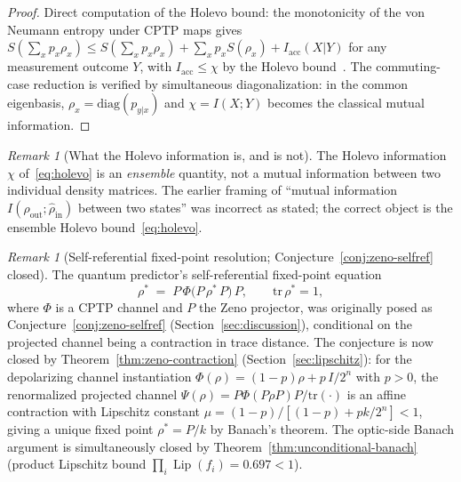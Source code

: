 \documentclass[11pt,a4paper]{article}
\theoremstyle{plain}
\theoremstyle{definition}
\theoremstyle{remark}
\newtheorem{remark}[theorem]{Remark}
\DeclareMathOperator{\Lip}{Lip}
\begin{document}
\begin{proof}
Direct computation of the Holevo bound: the monotonicity of the von
Neumann entropy under CPTP maps gives $S(\sum_x p_x \rho_x) \leq
S(\sum_x p_x \rho_x) + \sum_x p_x S(\rho_x) + I_{\mathrm{acc}}(X|Y)$
for any measurement outcome $Y$, with $I_{\mathrm{acc}} \leq \chi$ by
the Holevo bound~\cite{holevo1973,nielsen2000}. The commuting-case
reduction is verified by simultaneous diagonalization: in the common
eigenbasis, $\rho_x = \mathrm{diag}(p_{y|x})$ and $\chi = I(X; Y)$
becomes the classical mutual information.
\end{proof}

\begin{remark}[What the Holevo information is, and is not]
The Holevo information $\chi$ of~\eqref{eq:holevo} is an
\emph{ensemble} quantity, not a mutual information between two
individual density matrices. The earlier framing of ``mutual
information $I(\rho_{\mathrm{out}}; \hat\rho_{\mathrm{in}})$ between
two states'' was incorrect as stated; the correct object is the
ensemble Holevo bound~\eqref{eq:holevo}.
\end{remark}

\begin{remark}[Self-referential fixed-point resolution; Conjecture~\ref{conj:zeno-selfref}
closed]
\label{rem:zeno-fixed-point}
The quantum predictor's self-referential fixed-point equation
\begin{equation}\label{eq:zeno-fixed-point}
  \rho^* \;=\; P\,\Phi\bigl(P\,\rho^*\,P\bigr)\,P,
  \qquad \mathrm{tr}\,\rho^* = 1,
\end{equation}
where $\Phi$ is a CPTP channel and $P$ the Zeno projector, was originally
posed as Conjecture~\ref{conj:zeno-selfref} (Section~\ref{sec:discussion}),
conditional on the projected channel being a contraction in trace distance.
The conjecture is now closed by
Theorem~\ref{thm:zeno-contraction} (Section~\ref{sec:lipschitz}):
for the depolarizing channel instantiation $\Phi(\rho)=(1-p)\rho
+p\,I/2^{n}$ with $p>0$, the renormalized projected channel
$\Psi(\rho)=P\Phi(P\rho P)P/\mathrm{tr}(\cdot)$ is an affine
contraction with Lipschitz constant $\mu=(1-p)/[(1-p)+pk/2^{n}]<1$,
giving a unique fixed point $\rho^{*}=P/k$ by Banach's theorem. The
optic-side Banach argument is simultaneously closed by
Theorem~\ref{thm:unconditional-banach} (product Lipschitz bound
$\prod_{i}\Lip(f_{i})=0.697<1$).
\end{remark}
\end{document}
